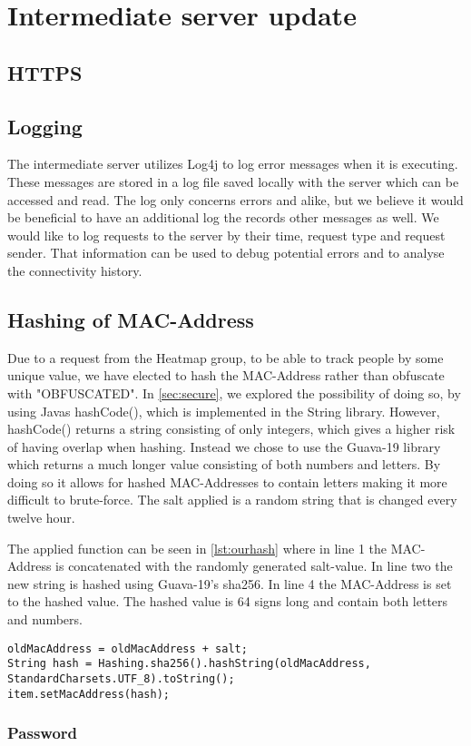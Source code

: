 \section{Intermediate server update}

\subsection*{HTTPS}

\subsection*{Logging}
The intermediate server utilizes Log4j\cite{log4j} to log error messages when it is executing. These messages are stored in a log file saved locally with the server which can be accessed and read. The log only concerns errors and alike, but we believe it would be beneficial to have an additional log the records other messages as well. We would like to log requests to the server by their time, request type and request sender. That information can be used to debug potential errors and to analyse the connectivity history. 

\subsection*{Hashing of MAC-Address}
Due to a request from the Heatmap group, to be able to track people by some unique value, we have elected to hash the MAC-Address rather than obfuscate with "OBFUSCATED". In \cref{sec:secure}, we explored the possibility of doing so, by using Javas hashCode(), which is implemented in the String library. However, hashCode() returns a string consisting of only integers, which gives a higher risk of having overlap when hashing. Instead we chose to use the Guava-19 library which returns a much longer value consisting of both numbers and letters. By doing so it allows for hashed MAC-Addresses to contain letters making it more difficult to brute-force. The salt applied is a random string that is changed every twelve hour. 

The applied function can be seen in \cref{lst:ourhash} where in line 1 the MAC-Address is concatenated with the randomly generated salt-value. In line two the new string is hashed using Guava-19's sha256. In line 4 the MAC-Address is set to the hashed value. The hashed value is 64 signs long and contain both letters and numbers.

\begin{lstlisting}[caption={Hashing a MAC-Address},label={lst:ourhash},language=inc_Java]
oldMacAddress = oldMacAddress + salt;
String hash = Hashing.sha256().hashString(oldMacAddress, 
StandardCharsets.UTF_8).toString();
item.setMacAddress(hash);
\end{lstlisting}


\subsubsection*{Password}

